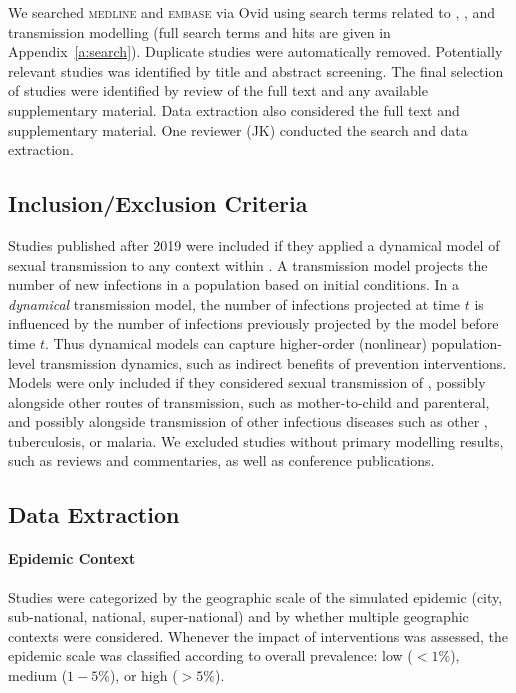 We searched \textsc{medline} and \textsc{embase} via Ovid
using search terms related to \hiv, \ssa, and transmission modelling
(full search terms and hits are given in Appendix~\ref{a:search}).
Duplicate studies were automatically removed.
Potentially relevant studies was identified by title and abstract screening.
The final selection of studies were identified by review of
the full text and any available supplementary material.
Data extraction also considered the full text and supplementary material.
One reviewer (JK) conducted the search and data extraction.
\subsection{Inclusion/Exclusion Criteria}
\label{ss:meth:inex}
Studies published after 2019 were included if
they applied a dynamical model of sexual \hiv transmission
to any context within \ssa.
A \hiv transmission model projects the number of new \hiv infections
in a population based on initial conditions.
In a \emph{dynamical} transmission model,
the number of infections projected at time $t$ is influenced by
the number of infections previously projected by the model before time $t$.
Thus dynamical models can capture
higher-order (nonlinear) population-level transmission dynamics,
such as indirect benefits of prevention interventions.
Models were only included if they considered sexual transmission of \hiv,
possibly alongside other routes of transmission,
such as mother-to-child and parenteral,
and possibly alongside transmission of other infectious diseases
such as other \sti, tuberculosis, or malaria.
We excluded studies without primary modelling results,
such as reviews and commentaries,
as well as conference publications.
\subsection{Data Extraction}
\label{ss:meth:data}
\paragraph{Epidemic Context}
Studies were categorized by the geographic scale of the simulated epidemic
(city, sub-national, national, super-national)
and by whether multiple geographic contexts were considered.
Whenever the impact of interventions was assessed,
the epidemic scale was classified according to overall \hiv prevalence:
low ($<1\%$), medium ($1-5\%$), or high ($>5\%$).
